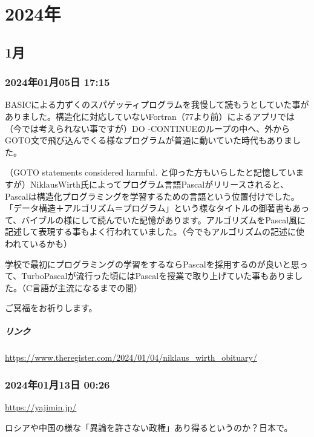 \documentclass[facebook_diary.tex]{subfiles}
\begin{document}
\chapter{2024年}

\section{1月}

\subsection*{2024年01月05日 17:15}

BASICによる力ずくのスパゲッティプログラムを我慢して読もうとしていた事がありました。構造化に対応していないFortran（77より前）によるアプリでは（今では考えられない事ですが）DO -CONTINUEのループの中へ、外からGOTO文で飛び込んでくる様なプログラムが普通に動いていた時代もありました。


（GOTO statements considered harmful. と仰った方もいらしたと記憶していますが）NiklausWirth氏によってプログラム言語Pascalがリリースされると、Pascalは構造化プログラミングを学習するための言語という位置付けでした。「データ構造＋アルゴリズム＝プログラム」という様なタイトルの御著書もあって、バイブルの様にして読んでいた記憶があります。アルゴリズムをPascal風に記述して表現する事もよく行われていました。（今でもアルゴリズムの記述に使われているかも）


学校で最初にプログラミングの学習をするならPascalを採用するのが良いと思って、TurboPascalが流行った頃にはPascalを授業で取り上げていた事もありました。（C言語が主流になるまでの間）


ご冥福をお祈りします。

\paragraph{リンク}
\url{https://www.theregister.com/2024/01/04/niklaus_wirth_obituary/}

\subsection*{2024年01月13日 00:26}

\url{https://yajimin.jp/}




ロシアや中国の様な「異論を許さない政権」あり得るというのか？日本で。
\end{document}
